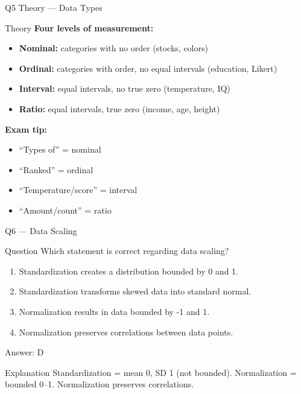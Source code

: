 \documentclass[aspectratio=169,8pt]{beamer}
\begin{document}
	\begin{frame}{Q5 Theory --- Data Types}
		\begin{block}{Theory}
			\textbf{Four levels of measurement:}
			\begin{itemize}
				\item \textbf{Nominal:} categories with no order (stocks, colors)
				\item \textbf{Ordinal:} categories with order, no equal intervals (education, Likert)
				\item \textbf{Interval:} equal intervals, no true zero (temperature, IQ)
				\item \textbf{Ratio:} equal intervals, true zero (income, age, height)
			\end{itemize}
			\textbf{Exam tip:}
			\begin{itemize}
				\item ``Types of'' = nominal
				\item ``Ranked'' = ordinal
				\item ``Temperature/score'' = interval
				\item ``Amount/count'' = ratio
			\end{itemize}
		\end{block}
	\end{frame}
	
	\begin{frame}{Q6 --- Data Scaling}
		\begin{block}{Question}
			Which statement is correct regarding data scaling?
		\end{block}
		\begin{enumerate}[label=\Alph*.]
			\item Standardization creates a distribution bounded by 0 and 1.
			\item Standardization transforms skewed data into standard normal.
			\item Normalization results in data bounded by -1 and 1.
			\item Normalization preserves correlations between data points.
		\end{enumerate}
		\begin{exampleblock}{Answer: D}
		\end{exampleblock}
		\begin{block}{Explanation}
			Standardization = mean 0, SD 1 (not bounded). Normalization = bounded 0--1. Normalization preserves correlations.
		\end{block}
	\end{frame}
	
\end{document}
